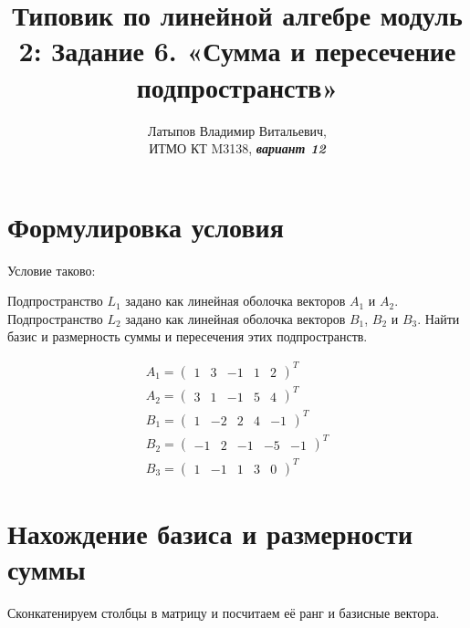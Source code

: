 \documentclass[12pt, a4paper]{article}
\author{Латыпов Владимир Витальевич, \\ ИТМО КТ M3138, \Huge{\textit{\textbf{вариант 12}}}}
\title{Типовик по линейной алгебре модуль 2: Задание 6. «Сумма и пересечение подпространств»}
\begin{document}
    \tit

    \section{Формулировка условия}

    \begin{statement}
        Условие таково: 

        Подпространство $L_1$ задано как линейная оболочка векторов $A_1$ и $A_2$.
        Подпространство $L_2$ задано как линейная оболочка векторов $B_1$, $B_2$ и $B_3$.
        Найти базис и размерность суммы и пересечения этих подпространств.

        \begin{gather}
            A_1 = \begin{pmatrix}
                1 & 3 & −1 & 1 & 2
            \end{pmatrix}^T \\ 
            A_2 = \begin{pmatrix}
                3 & 1 & −1 & 5 & 4
            \end{pmatrix}^T \\ 
            B_1 = \begin{pmatrix}
                1 & -2 & 2 & 4 & -1
            \end{pmatrix}^T \\ 
            B_2 = \begin{pmatrix}
                -1 & 2 & −1 & -5 & -1
            \end{pmatrix}^T \\ 
            B_3 = \begin{pmatrix}
                1 & -1 & 1 & 3 & 0
            \end{pmatrix}^T
        \end{gather}
    \end{statement}

    \section{Нахождение базиса и размерности суммы}

    Сконкатенируем столбцы в матрицу и посчитаем её ранг и базисные вектора.
\end{document}
